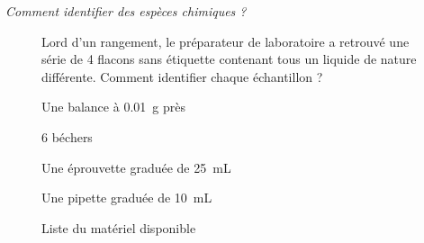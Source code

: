\documentclass[a4paper,11pt,fleqn]{article}%
\begin{document}
\maketitle

\emph{Comment identifier des espèces chimiques ?}
\begin{figure}[h!]
	\begin{minipage}{.48\linewidth}
	\caption{Une situation à éclaircir}
	Lord d'un rangement, le préparateur de laboratoire a retrouvé une série de 4 flacons sans étiquette contenant tous un liquide de nature différente. Comment identifier chaque échantillon ?
	\end{minipage}\hspace{.04\linewidth}
	\begin{minipage}{.48\linewidth}
	\caption{Liste du matériel disponible}
	\begin{itemize*}
		\item Une balance à \SI{0,01}{g} près
		\item 6 béchers
		\item Une éprouvette graduée de \SI{25}{mL}
		\item Une pipette graduée de \SI{10}{mL}
	\end{itemize*}
	\end{minipage}
	
	\vspace{2em}
	

\end{figure}
\end{document}

